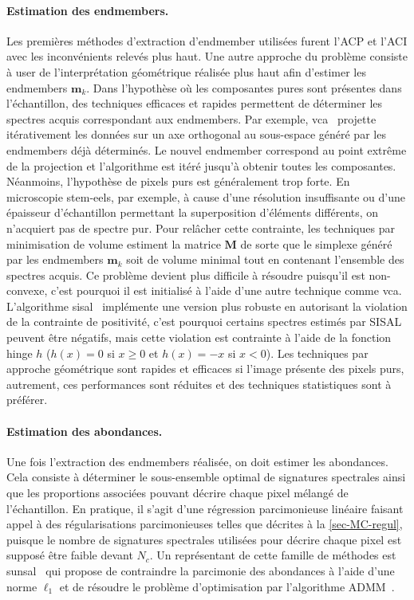     \paragraph{Estimation des endmembers.} Les premières méthodes d'extraction d'endmember utilisées furent l'ACP et l'ACI avec les inconvénients relevés plus haut.
    Une autre approche du problème consiste à user de l'interprétation géométrique réalisée plus haut afin d'estimer les endmembers $\mathbf{m}_k$. Dans l'hypothèse où les composantes pures sont présentes dans l'échantillon, des techniques efficaces et rapides permettent de déterminer les spectres acquis correspondant aux endmembers. Par exemple, \gls{vca}~\cite{nascimento2005vertex} projette itérativement les données sur un axe orthogonal au sous-espace généré par les endmembers déjà déterminés. Le nouvel endmember correspond au point extrême de la projection et l'algorithme est itéré jusqu'à obtenir toutes les composantes. Néanmoins, l'hypothèse de pixels purs est généralement trop forte. En microscopie \gls{stem}-\gls{eels}, par exemple, à cause d'une résolution insuffisante ou d'une épaisseur d'échantillon permettant la superposition d'éléments différents, on n'acquiert pas de spectre pur. Pour relâcher cette contrainte, les techniques par minimisation de volume estiment la matrice $\mathbf{M}$ de sorte que le simplexe généré par les endmembers $\mathbf{m}_k$ soit de volume minimal tout en contenant l'ensemble des spectres acquis. Ce problème devient plus difficile à résoudre puisqu'il est non-convexe, c'est pourquoi il est initialisé à l'aide d'une autre technique comme \gls{vca}. L'algorithme \gls{sisal}~\cite{bioucas2009variable} implémente une version plus robuste en autorisant la violation de la contrainte de positivité, c'est pourquoi certains spectres estimés par SISAL peuvent être négatifs, mais cette violation est contrainte à l'aide de la fonction hinge $h$ ($h(x) = 0$ si $x \geq 0$ et $h(x)=-x$ si $x<0$). Les techniques par approche géométrique sont rapides et efficaces si l'image présente des pixels purs, autrement, ces performances sont réduites et des techniques statistiques sont à préférer.
    
    \paragraph{Estimation des abondances.} Une fois l'extraction des endmembers réalisée, on doit estimer les abondances.  Cela consiste à déterminer le sous-ensemble optimal de signatures spectrales ainsi que les proportions associées pouvant décrire chaque pixel mélangé de l'échantillon. En pratique, il s'agit d'une régression parcimonieuse linéaire faisant appel à des régularisations parcimonieuses telles que décrites à la \cref{sec-MC-regul}, puisque le nombre de signatures spectrales utilisées pour décrire chaque pixel est supposé être faible devant $N_c$. Un représentant de cette famille de méthodes est \gls{sunsal}~\cite{bioucas2010alternating} qui propose de contraindre la parcimonie des abondances à l'aide d'une norme $\ell_1$ et de résoudre le problème d'optimisation par l'algorithme ADMM~\cite{eckstein1992douglas, combettes2011proximal}.
    
